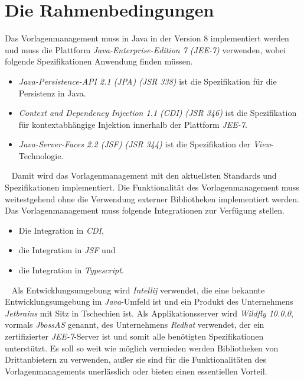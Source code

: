\section{Die Rahmenbedingungen}
Das Vorlagenmanagement muss in Java in der Version 8 implementiert werden und muss die Plattform \emph{Java-Enterprise-Edition 7 (JEE-7)} verwenden, wobei folgende Spezifikationen Anwendung finden müssen.
\begin{itemize}
	\item \emph{Java-Persistence-API 2.1 (JPA) (JSR 338)}
	\newline
	ist die Spezifikation für die Persistenz in Java.
	\item \emph{Context and Dependency Injection 1.1 (CDI) (JSR 346)}
	\newline
	ist die Spezifikation für kontextabhängige Injektion innerhalb der Plattform \emph{JEE-7}.
	\item \emph{Java-Server-Faces 2.2 (JSF) (JSR 344)} 
	\newline
	ist die Spezifikation der \emph{View}-Technologie. 
\end{itemize}
\ \newline
Damit wird das Vorlagenmanagement mit den aktuellsten Standards und Spezifikationen implementiert. Die Funktionalität des Vorlagenmanagement muss weitestgehend ohne die Verwendung externer Bibliotheken implementiert werden. Das Vorlagenmanagement muss folgende Integrationen zur Verfügung stellen.
\begin{itemize}
	\item Die Integration in \emph{CDI},
	\item die Integration in \emph{JSF} und
	\item die Integration in \emph{Typescript}.
\end{itemize} 
\ \newline
Als Entwicklungsumgebung wird \emph{Intellij} verwendet, die eine bekannte Entwicklungsumgebung im \emph{Java}-Umfeld ist und ein Produkt des Unternehmens \emph{Jetbrains} mit Sitz in Tschechien ist. Als Applikationsserver wird \emph{Wildfly 10.0.0}, vormals \emph{JbossAS} genannt, des Unternehmens \emph{Redhat} verwendet, der ein zertifizierter \emph{JEE-7}-Server ist und somit alle benötigten Spezifikationen unterstützt. Es soll so weit wie möglich vermieden werden Bibliotheken von Drittanbietern zu verwenden, außer sie sind für die Funktionalitäten des Vorlagenmanagements unerlässlich oder bieten einen essentiellen Vorteil.

